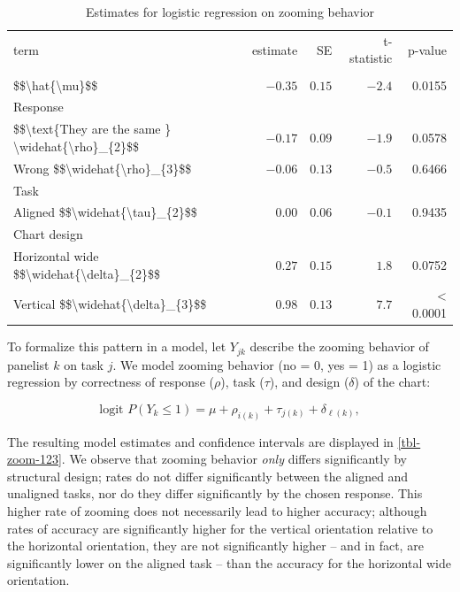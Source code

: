\documentclass[
]{jds}
\begin{document}
\hypertarget{tbl-zoom-123}{}
\begin{longtable}{lrrrr}
\caption{\label{tbl-zoom-123}Coefficients for logistic regression of zooming by task }\tabularnewline

\caption*{
{\large Estimates for logistic regression on zooming behavior}
} \\ 
\toprule
term & estimate & SE & t-statistic & p-value \\ 
\midrule
\multicolumn{5}{l}{} \\ 
\midrule
\$\$\textbackslash{}hat\{\textbackslash{}mu\}\$\$ & $-0.35$ & $0.15$ & $-2.4$ & 0.0155 \\ 
\midrule
\multicolumn{5}{l}{Response} \\ 
\midrule
\$\$\textbackslash{}text\{They are the same \} \textbackslash{}widehat\{\textbackslash{}rho\}\_\{2\}\$\$ & $-0.17$ & $0.09$ & $-1.9$ & 0.0578 \\ 
Wrong \$\$\textbackslash{}widehat\{\textbackslash{}rho\}\_\{3\}\$\$ & $-0.06$ & $0.13$ & $-0.5$ & 0.6466 \\ 
\midrule
\multicolumn{5}{l}{Task} \\ 
\midrule
Aligned \$\$\textbackslash{}widehat\{\textbackslash{}tau\}\_\{2\}\$\$ & $0.00$ & $0.06$ & $-0.1$ & 0.9435 \\ 
\midrule
\multicolumn{5}{l}{Chart design} \\ 
\midrule
Horizontal wide \$\$\textbackslash{}widehat\{\textbackslash{}delta\}\_\{2\}\$\$ & $0.27$ & $0.15$ & $1.8$ & 0.0752 \\ 
Vertical \$\$\textbackslash{}widehat\{\textbackslash{}delta\}\_\{3\}\$\$ & $0.98$ & $0.13$ & $7.7$ & < 0.0001 \\ 
\bottomrule
\end{longtable}

To formalize this pattern in a model, let \(Y_{jk}\) describe the
zooming behavior of panelist \(k\) on task \(j\). We model zooming
behavior (no = 0, yes = 1) as a logistic regression by correctness of
response (\(\rho\)), task (\(\tau\)), and design (\(\delta\)) of the
chart:

\[
\text{logit } P(Y_k \le 1) = \mu + \rho_{i(k)} + \tau_{j(k)} + \delta_{\ell(k)},
\]

The resulting model estimates and confidence intervals are displayed in
\autoref{tbl-zoom-123}. We observe that zooming behavior \emph{only}
differs significantly by structural design; rates do not differ
significantly between the aligned and unaligned tasks, nor do they
differ significantly by the chosen response. This higher rate of zooming
does not necessarily lead to higher accuracy; although rates of accuracy
are significantly higher for the vertical orientation relative to the
horizontal orientation, they are not significantly higher -- and in
fact, are significantly lower on the aligned task -- than the accuracy
for the horizontal wide orientation.
\end{document}
